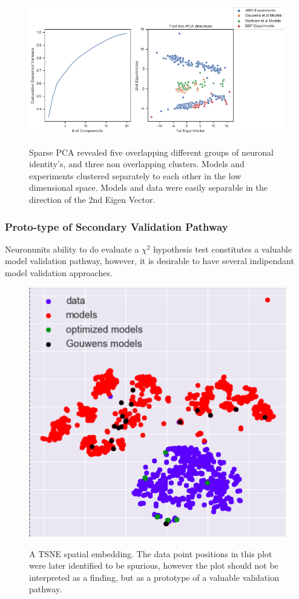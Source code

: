 \begin{figure}    
\begin{center} \includegraphics[width=1.0\linewidth]{figures/cortical_model_data_agreement_52_1}
\label{fig:}
\end{center}
\caption[Sparse PCA, variance explained, 1st and 2nd Principal Components]{Sparse PCA revealed five overlapping different groups of neuronal identity's, and three non overlapping clusters. Models and experiments clustered separately to each other in the low dimensional space. Models and data were easily separable in the direction of the 2nd Eigen Vector.}
\label{fig:pca_data_points}
\end{figure}    


\subsubsection{Proto-type of Secondary Validation Pathway}
Neuronunits ability to do evaluate a $\chi^{2}$ hypothesis test constitutes a valuable model validation pathway, however, it is desirable to have several indipendant model validation approaches. 
\begin{figure}    
\begin{center} \includegraphics[width=0.5\linewidth]{figures/optimized_model_fit_onto_big_distribution.png}
\label{fig:TSNE}
\end{center}
\caption[A TSNE Low Spatial Embedding Optimized Models]{A TSNE spatial embedding. The data point positions in this plot were later identified to be spurious, however the plot should not be interpreted as a finding, but as a prototype of a valuable validation pathway.}


\label{fig:tsne_opt_model_points}
\end{figure}    

